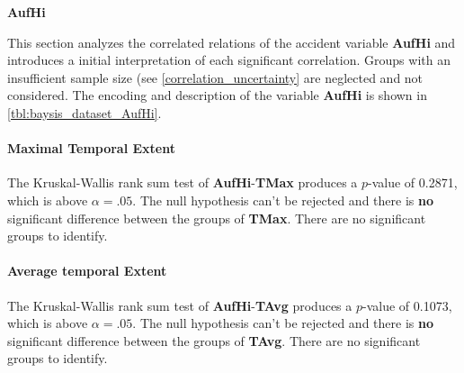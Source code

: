 \Large
\centerline{\textbf{AufHi}}
\normalsize
This section analyzes the correlated relations of the accident variable \textbf{AufHi} and introduces a initial interpretation of each significant correlation. Groups with an insufficient sample size (see \cref{correlation_uncertainty} are neglected and not considered. The encoding and description of the variable \textbf{AufHi} is shown in \cref{tbl:baysis_dataset_AufHi}.

\paragraph{Maximal Temporal Extent}
The Kruskal-Wallis rank sum test of \textbf{AufHi}-\textbf{TMax} produces a $p$-value of 0.2871, which is above $\alpha=.05$. The null hypothesis can't be rejected and there is \textbf{no} significant difference between the groups of \textbf{TMax}. There are no significant groups to identify.

\paragraph{Average temporal Extent}
The Kruskal-Wallis rank sum test of \textbf{AufHi}-\textbf{TAvg} produces a $p$-value of 0.1073, which is above $\alpha=.05$. The null hypothesis can't be rejected and there is \textbf{no} significant difference between the groups of \textbf{TAvg}. There are no significant groups to identify.

